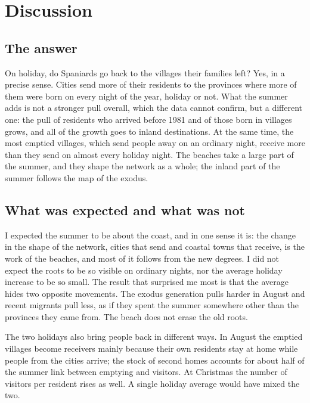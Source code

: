 \section{Discussion}\label{sec:discussion}

\subsection{The answer}

On holiday, do Spaniards go back to the villages their families left? Yes, in a precise sense. Cities send more of their residents to the provinces where more of them were born on every night of the year, holiday or not. What the summer adds is not a stronger pull overall, which the data cannot confirm, but a different one: the pull of residents who arrived before 1981 and of those born in villages grows, and all of the growth goes to inland destinations. At the same time, the most emptied villages, which send people away on an ordinary night, receive more than they send on almost every holiday night. The beaches take a large part of the summer, and they shape the network as a whole; the inland part of the summer follows the map of the exodus.

\subsection{What was expected and what was not}

I expected the summer to be about the coast, and in one sense it is: the change in the shape of the network, cities that send and coastal towns that receive, is the work of the beaches, and most of it follows from the new degrees. I did not expect the roots to be so visible on ordinary nights, nor the average holiday increase to be so small. The result that surprised me most is that the average hides two opposite movements. The exodus generation pulls harder in August and recent migrants pull less, as if they spent the summer somewhere other than the provinces they came from. The beach does not erase the old roots.

The two holidays also bring people back in different ways. In August the emptied villages become receivers mainly because their own residents stay at home while people from the cities arrive; the stock of second homes accounts for about half of the summer link between emptying and visitors. At Christmas the number of visitors per resident rises as well. A single holiday average would have mixed the two.

